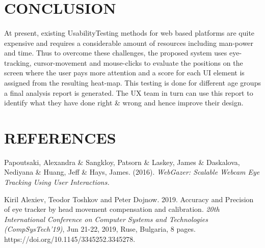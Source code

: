 \documentclass[a4paper,12pt,oneside]{article}
\begin{document}
\newpage
\section{CONCLUSION}
\paragraph{}
At present, existing Usability\-Testing methods for web based platforms are quite expensive and requires a considerable amount of resources including man-power and time.
Thus to overcome these challenges, the proposed system uses eye-tracking, cursor-movement and mouse-clicks to evaluate the positions on the screen where the user pays more attention and a score for each UI element is assigned from the resulting heat-map.
This testing is done for different age groups a final analysis report is generated. The UX team in turn can use this report to identify what they have done right \& wrong and hence improve their design.


\newpage

\section{REFERENCES}
\begin{thebibliography}{9}
    Papoutsaki, Alexandra \& Sangkloy, Patsorn \& Laskey, James \& Daskalova, Nediyana \& Huang, Jeff \& Hays, James. (2016). \emph{WebGazer: Scalable Webcam Eye Tracking Using User Interactions.}

    Kiril Alexiev, Teodor Toshkov and Peter Dojnow. 2019. Accuracy and Precision of eye tracker by head movement compensation and calibration. \emph{20th International Conference on Computer Systems and Technologies
(CompSysTech'19)}, Jun 21-22, 2019, Ruse, Bulgaria, 8 pages.
https://doi.org/10.1145/3345252.3345278.



\end{thebibliography}
\end{document}
